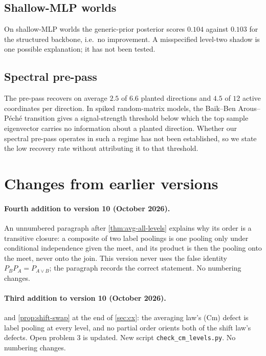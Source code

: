 \documentclass[11pt]{article}
\theoremstyle{definition}
\theoremstyle{remark}
\begin{document}
\subsection{Shallow-MLP worlds}
On shallow-MLP worlds the generic-prior posterior scores $0.104$ against $0.103$ for the structured
backbone, i.e.\ no improvement. A misspecified level-two shadow is one possible explanation; it has not been
tested.

\subsection{Spectral pre-pass}
The pre-pass recovers on average $2.5$ of $6.6$ planted directions and $4.5$ of $12$ active
coordinates per direction. In spiked random-matrix models, the Baik--Ben Arous--P\'ech\'e transition
\cite{BBP2005} gives a signal-strength threshold below which the top sample eigenvector carries no
information about a planted direction. Whether our spectral pre-pass operates in such a regime has
not been established, so we state the low recovery rate without attributing it to that threshold.

\section{Changes from earlier versions}\label{app:changes}

\paragraph{Fourth addition to version 10 (October 2026).} An unnumbered paragraph after \cref{thm:avg-all-levels} explains why
its order is a transitive closure: a composite of two label poolings is one pooling only under conditional independence given the
meet, and its product is then the pooling onto the meet, never onto the join. This version never uses the false identity
$P_BP_A=P_{A\vee B}$; the paragraph records the correct statement. No numbering changes.

\paragraph{Third addition to version 10 (October 2026).}  and \cref{prop:shift-swap} at the end
of \cref{sec:cx}: the averaging law's (Cm) defect is label pooling at every level, and no partial order orients both of the shift
law's defects. Open problem 3 is updated. New script \texttt{check\_cm\_levels.py}. No numbering changes.
\end{document}
